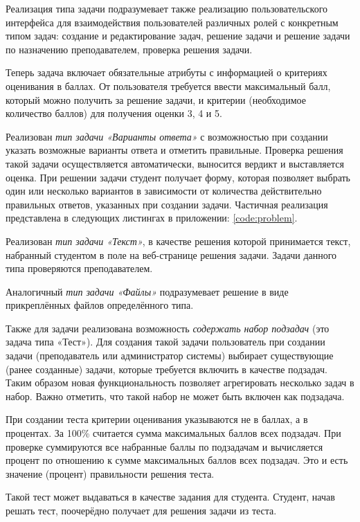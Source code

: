 \documentclass[a4paper]{article}
\begin{document}
Реализация типа задачи подразумевает также реализацию пользовательского интерфейса для взаимодействия пользователей различных ролей с конкретным типом задач: создание и редактирование задач, решение задачи и решение задачи по назначению преподавателем, проверка решения задачи.

Теперь задача включает обязательные атрибуты с информацией о критериях оценивания в баллах. От пользователя требуется ввести максимальный балл, который можно получить за решение задачи, и критерии (необходимое количество баллов) для получения оценки 3, 4 и 5.

Реализован \emph{тип задачи «Варианты ответа»} с возможностью при создании указать возможные варианты ответа и отметить правильные. Проверка решения такой задачи осуществляется автоматически, выносится вердикт и выставляется оценка. При решении задачи студент получает форму, которая позволяет выбрать один или несколько вариантов в зависимости от количества действительно правильных ответов, указанных при создании задачи. Частичная реализация представлена в следующих листингах в приложении: \ref{code:problem}.

Реализован \emph{тип задачи «Текст»}, в качестве решения которой принимается текст, набранный студентом в поле на веб-странице решения задачи. Задачи данного типа проверяются преподавателем.

Аналогичный \emph{тип задачи «Файлы»} подразумевает решение в виде прикреплённых файлов определённого типа.

Также для задачи реализована возможность \emph{содержать набор подзадач} (это задача типа «Тест»). Для создания такой задачи пользователь при создании задачи (преподаватель или администратор системы) выбирает существующие (ранее созданные) задачи, которые требуется включить в качестве подзадач. Таким образом новая функциональность позволяет агрегировать несколько задач в набор. Важно отметить, что такой набор не может быть включен как подзадача.

При создании теста критерии оценивания указываются не в баллах, а в процентах. За 100\% считается сумма максимальных баллов всех подзадач. При проверке суммируются все набранные баллы по подзадачам и вычисляется процент по отношению к сумме максимальных баллов всех подзадач. Это и есть значение (процент) правильности решения теста.

Такой тест может выдаваться в качестве задания для студента. Студент, начав решать тест, поочерёдно получает для решения задачи из теста.
\end{document}
